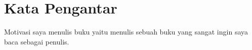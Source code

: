 \section{ \LARGE Kata Pengantar}
   
   Motivasi saya menulis buku yaitu menulis sebuah buku yang sangat ingin saya baca sebagai penulis.